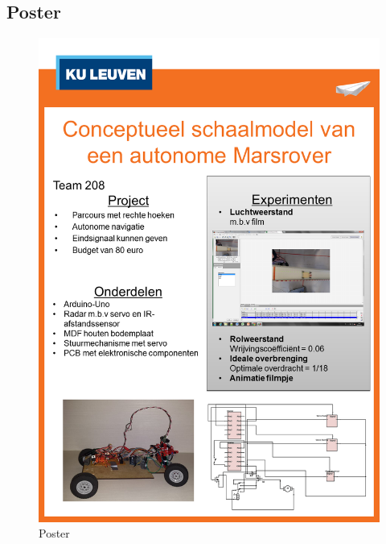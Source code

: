 \subsection{Poster}
\label{bijlage:poster}

\begin{figure}[H]
\center
 \includegraphics[width=\linewidth]{bijlagen/poster/poster.png}
 \caption{Poster}
 \label{image:poster}
\end{figure}

\FloatBarrier